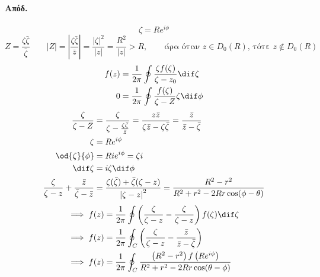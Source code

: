 \documentclass[12pt,a4paper,notitlepage,fleqn]{article}
\begin{document}
    
    \paragraph{Απόδ.}
    \[
    \zeta = Re^{i\phi}
    \]
    \[
    Z = \frac{\zeta\bar\zeta}{\bar\zeta}
    \qquad |Z| = \left| \frac{\zeta\bar\zeta}{\bar z} \right| = 
    \frac{\left|\zeta\right|^2}{|z|} = \frac{R^2}{|z|} > R,
    \qquad \text{άρα όταν $z\in D_0(R)$, τότε $z\notin D_0(R)$}
    \]
    \begin{align*}
    	f(z) &= \frac{1}{2\pi} \oint \frac{\zeta f(\zeta)}{\zeta - z_0}\dif\zeta
    	\\ 0 &= \frac{1}{2\pi} \oint \frac{f(\zeta)}{\zeta - Z}\zeta \dif\phi
    \end{align*}
    \begin{align*}
    	\frac{\zeta}{\zeta-Z} &= \frac{\zeta}{\zeta - \frac{\zeta\bar\zeta}{\bar z}}
    	= \frac{z\bar z}{\zeta \bar z - \zeta\bar\zeta}=\frac{\bar z}{\bar z -\bar\zeta}
    	\\
    	\zeta &= Re^{i\phi} \\
    	\od{\zeta}{\phi} &= Rie^{i\phi} = \zeta i \\
    	\dif \zeta &= i\zeta\dif\phi
        \\
        \frac{\zeta}{\zeta-z}+\frac{\bar z}{\bar\zeta -\bar z}
        &= \frac{\zeta(\bar \zeta)+\bar\zeta(\zeta-z)}{\left|\zeta-z\right|^2}
        = \frac{R^2-r^2}{R^2+r^2-2Rr\cos(\phi-\theta)}
    \end{align*}
    \begin{align*}
    \implies f(z) &= \frac{1}{2\pi} \oint
    \left( \frac{\zeta}{\zeta - z} - \frac{\zeta}{\zeta - z} \right) f(\zeta)\dif\zeta
    \\ \implies f(z) &= \frac{1}{2\pi} \oint_C \left(
    \frac{\zeta}{\zeta-z}-\frac{\bar z}{\bar z - \bar\zeta}
    \right)
    \\ \implies f(z) &= \frac{1}{2\pi} \oint_C 
    \frac{\left(R^2-r^2\right) f\left(Re^{i\phi}\right)}{R^2+r^2-2Rr\cos(\theta-\phi)}
    \end{align*}
    
\end{document}
